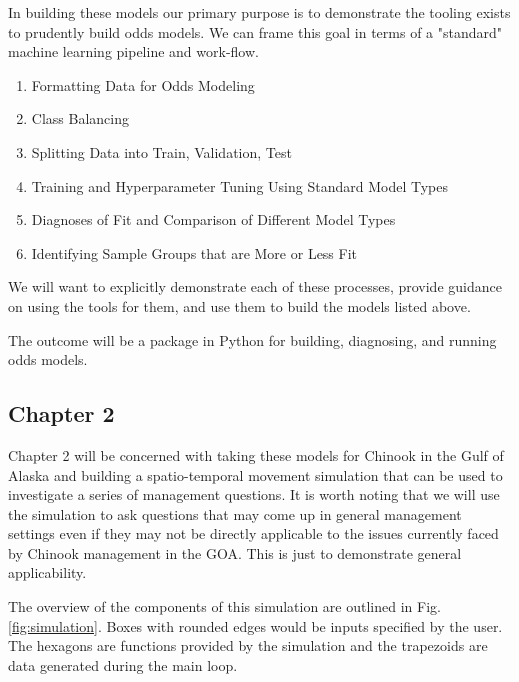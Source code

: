 \documentclass[11pt]{article}
\begin{document}
In building these models our primary purpose is to demonstrate the tooling exists to prudently build odds models. We can frame this goal in terms of a "standard" machine learning pipeline and work-flow. 

\begin{enumerate}
\item Formatting Data for Odds Modeling 
\item Class Balancing
\item Splitting Data into Train, Validation, Test
\item Training and Hyperparameter Tuning Using Standard Model Types
\item Diagnoses of Fit and Comparison of Different Model Types
\item Identifying Sample Groups that are More or Less Fit
\end{enumerate}

We will want to explicitly demonstrate each of these processes, provide guidance on using the tools for them, and use them to build the models listed above. \newline

The outcome will be a package in Python for building, diagnosing, and running odds models.

\subsection{Chapter 2}

Chapter 2 will be concerned with taking these models for Chinook in the Gulf of Alaska and building a spatio-temporal movement simulation that can be used to investigate a series of management questions. It is worth noting that we will use the simulation to ask questions that may come up in general management settings even if they may not be directly applicable to the issues currently faced by Chinook management in the GOA. This is just to demonstrate general applicability. \newline

The overview of the components of this simulation are outlined in Fig. \ref{fig:simulation}. Boxes with rounded edges would be inputs specified by the user. The hexagons are functions provided by the simulation and the trapezoids are data generated during the main loop. 
\end{document}
